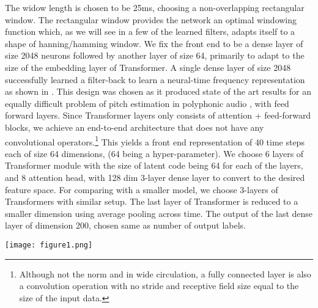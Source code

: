 \documentclass{article}
\begin{document}
\begin{sloppy}
The widow length is chosen to be 25ms, choosing a non-overlapping rectangular window. The rectangular window provides the network an optimal windowing function which, as we will see in a few of the learned filters, adapts itself to a shape of hanning/hamming window. We fix the front end to be a dense layer of size 2048 neurons followed by another layer of size 64, primarily to adapt to the size of the embedding layer of Transformer. A single dense layer of size 2048 successfully learned a filter-back to learn a neural-time frequency representation as shown in \cite{verma2016frequency}. This design was chosen as it produced state of the art results for an equally difficult problem of pitch estimation in polyphonic audio \cite{verma2016frequency}, with feed forward layers. Since Transformer layers only consists of attention + feed-forward blocks, we achieve an end-to-end architecture that does not have any convolutional operators.\footnote[1]{Although not the norm and in wide circulation,  a fully connected layer is also a convolution operation with no stride and receptive field size equal to the size of the input data. } 
This yields a front end representation of 40 time steps each of size 64 dimensions, (64 being a hyper-parameter). We choose 6 layers of Transformer module with the size of latent code being 64 for each of the layers, and 8 attention head, with 128 dim 3-layer dense layer to convert to the desired feature space. For comparing with a smaller model, we choose 3-layers of Transformers with similar setup. The last layer of Transformer is reduced to a smaller dimension using average pooling across time. The output of the last dense layer of dimension 200, chosen same as number of output labels. 


\begin{figure*}[tb]
\centering
\texttt{[image: figure1.png]}
\end{figure*}




\end{sloppy}
\end{document}
